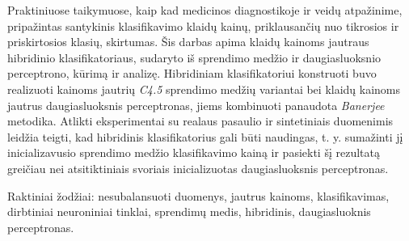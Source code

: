 
Praktiniuose taikymuose, kaip kad medicinos diagnostikoje ir veidų atpažinime, pripažintas santykinis klasifikavimo klaidų kainų, priklausančių nuo tikrosios ir priskirtosios klasių, skirtumas. Šis darbas apima klaidų kainoms jautraus hibridinio klasifikatoriaus, sudaryto iš sprendimo medžio ir daugiasluoksnio perceptrono, kūrimą ir analizę. Hibridiniam klasifikatoriui konstruoti buvo realizuoti kainoms jautrių \emph{C4.5} sprendimo medžių variantai bei klaidų kainoms jautrus daugiasluoksnis perceptronas, jiems kombinuoti panaudota \emph{Banerjee} metodika. Atlikti eksperimentai su realaus pasaulio ir sintetiniais duomenimis leidžia teigti, kad hibridinis klasifikatorius gali būti naudingas, t. y. sumažinti jį inicializavusio sprendimo medžio klasifikavimo kainą ir pasiekti šį rezultatą greičiau nei atsitiktiniais svoriais inicializuotas daugiasluoksnis perceptronas.

\bigskip
Raktiniai žodžiai: nesubalansuoti duomenys, jautrus kainoms, klasifikavimas, dirbtiniai neuroniniai tinklai, sprendimų medis, hibridinis, daugiasluoknis perceptronas.
